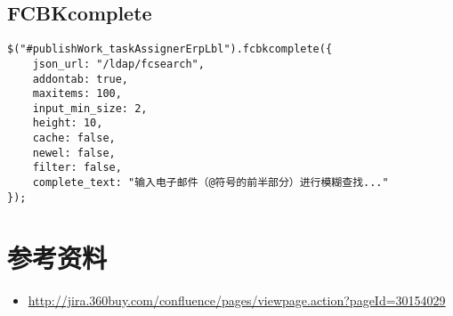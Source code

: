 \documentclass[11pt]{article}
\begin{document}
\subsection*{FCBKcomplete}
\label{sec-2-5}
\begin{verbatim}
$("#publishWork_taskAssignerErpLbl").fcbkcomplete({
    json_url: "/ldap/fcsearch",
    addontab: true,
    maxitems: 100,
    input_min_size: 2,
    height: 10,
    cache: false,
    newel: false,
    filter: false,
    complete_text: "输入电子邮件（@符号的前半部分）进行模糊查找..."
});
\end{verbatim}

\section*{参考资料}
\label{sec-3}

\begin{itemize}
\item \url{http://jira.360buy.com/confluence/pages/viewpage.action?pageId=30154029}
\end{itemize}
\end{document}
